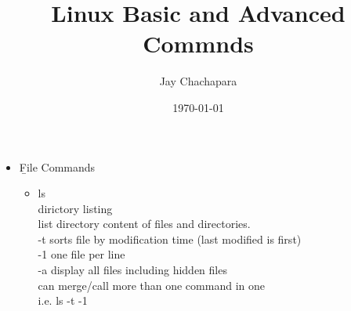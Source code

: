 \documentclass{article}
\title{Linux Basic and Advanced Commnds}
\author{Jay Chachapara}
\date{\today}
\begin{document}
	\maketitle
	\noindent
	\begin{itemize}
		\item \b {File Commands}
			\begin{itemize}
				\item ls \\					
					dirictory listing \\
					list directory content of files and directories.\\
					-t sorts file by modification time (last modified is first)\\
					-1 one file per line \\
					-a display all files including hidden files \\
					can merge/call more than one command in one \\ i.e. ls -t -1\\
					

\end{itemize}
\end{itemize}
\end{document}
